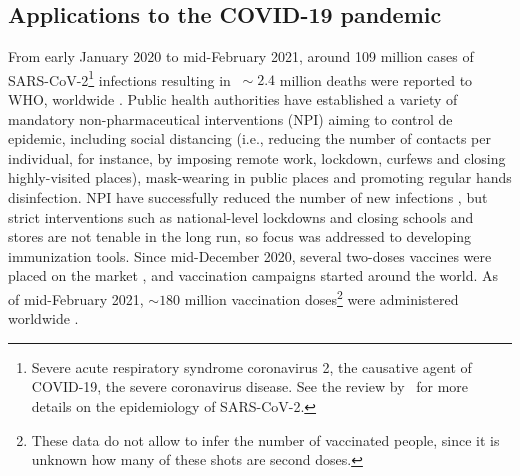 \subsection{Applications to the COVID-19 pandemic}

\noindent From early January 2020 to mid-February 2021, around 109 million cases of SARS-CoV-2\footnote{Severe acute respiratory syndrome coronavirus 2, the causative agent of COVID-19, the severe coronavirus disease. See the review by~\cite{Salzberger2020} for more details on the epidemiology of SARS-CoV-2.} infections resulting in $~\sim2.4$ million deaths were reported to WHO, worldwide \cite[]{WHO_CovidDashboard}. Public health authorities have established a variety of mandatory non-pharmaceutical interventions (NPI) aiming to control de epidemic, including social distancing (i.e., reducing the number of contacts per individual, for instance, by imposing remote work, lockdown, curfews and closing highly-visited places), mask-wearing in public places and promoting regular hands disinfection. NPI have successfully reduced the number of new infections \cite[]{Bo2021}, but strict interventions such as national-level lockdowns and closing schools and stores are not tenable in the long run, so focus was addressed to developing immunization tools. Since mid-December 2020, several two-doses vaccines %
were placed on the market \cite[]{WHO_CovidVaccines}, and vaccination campaigns started around the world. As of mid-February 2021, $\sim180$ million vaccination doses\footnote{These data do not allow to infer the number of vaccinated people, since it is unknown how many of these shots are second doses.} were administered worldwide \cite[]{OWID_CovidVaccination}.

